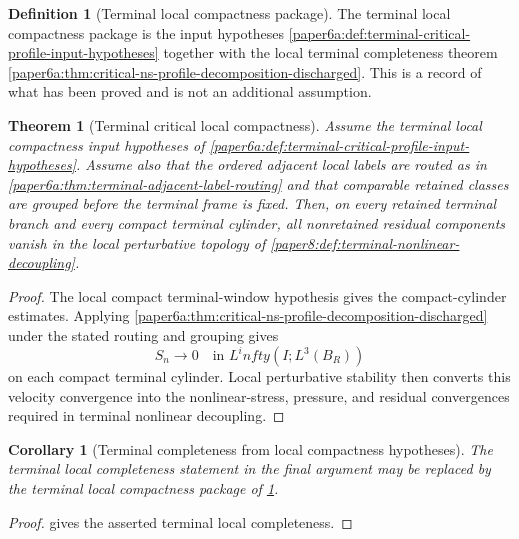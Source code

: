 \documentclass[11pt]{amsart}
\def\infty{infty}%
\theoremstyle{plain}
\newtheorem{theorem}{Theorem}[section]
\newtheorem{corollary}[corollary]{Corollary}
\theoremstyle{definition}
\newtheorem{definition}[definition]{Definition}
\theoremstyle{remark}
\begin{document}
\begin{definition}[Terminal local compactness package]
\label{paper6a:def:terminal-critical-profile-hypotheses}
The terminal local compactness package is the input hypotheses
\cref{paper6a:def:terminal-critical-profile-input-hypotheses} together with the
local terminal completeness theorem
\cref{paper6a:thm:critical-ns-profile-decomposition-discharged}.  This is a
record of what has been proved and is not an additional assumption.
\end{definition}

\begin{theorem}[Terminal critical local compactness]
\label{paper6a:thm:terminal-critical-local-compactness}
Assume the terminal local compactness input hypotheses of
\cref{paper6a:def:terminal-critical-profile-input-hypotheses}.  Assume also
that the ordered adjacent local labels are routed as in
\cref{paper6a:thm:terminal-adjacent-label-routing} and that comparable retained
classes are grouped before the terminal frame is fixed.  Then, on every
retained terminal branch and every compact terminal cylinder, all nonretained
residual components vanish in the local perturbative topology of
\cref{paper8:def:terminal-nonlinear-decoupling}.
\end{theorem}

\begin{proof}
The local compact terminal-window hypothesis gives the compact-cylinder
estimates.  Applying
\cref{paper6a:thm:critical-ns-profile-decomposition-discharged} under the
stated routing and grouping gives
\[
  S_n\to0\quad\text{in }L^\infty(I;L^3(B_R))
\]
on each compact terminal cylinder.  Local perturbative stability then converts
this velocity convergence into the nonlinear-stress, pressure, and residual
convergences required in terminal nonlinear decoupling.
\end{proof}

\begin{corollary}[Terminal completeness from local compactness hypotheses]
\label{paper6a:cor:profile-completeness-from-critical-hypotheses}
The terminal local completeness statement in the final argument may be
replaced by the terminal local compactness package of
\cref{paper6a:def:terminal-critical-profile-hypotheses}.
\end{corollary}

\begin{proof}
 gives the asserted
terminal local completeness.
\end{proof}
\end{document}
